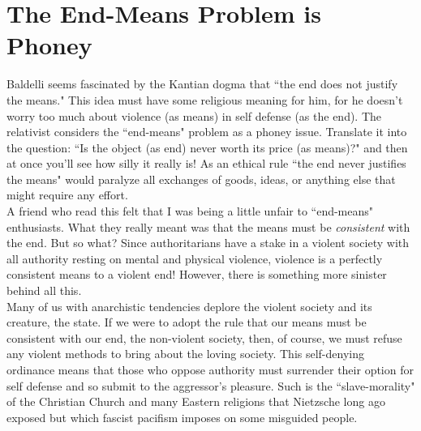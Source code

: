 \section*{The End-Means Problem is Phoney}
Baldelli seems fascinated by the Kantian dogma that ``the end does not justify the means." This idea must have some religious meaning for him, for he doesn't worry too much about violence (as means) in self defense (as the end). The relativist considers the ``end-means" problem as a phoney issue. Translate it into the question: ``Is the object (as end) never worth its price (as means)?" and then at once you'll see how silly it really is! As an ethical rule ``the end never justifies the means" would paralyze all exchanges of goods, ideas, or anything else that might require any effort.\\
A friend who read this felt that I was being a little unfair to ``end-means" enthusiasts. What they really meant was that the means must be \emph{consistent} with the end. But so what? Since authoritarians have a stake in a violent society with all authority resting on mental and physical violence, violence is a perfectly consistent means to a violent end! However, there is something more sinister behind all this.\\
Many of us with anarchistic tendencies deplore the violent society and its creature, the state. If we were to adopt the rule that our means must be consistent with our end, 
the non-violent society, then, of course, we must refuse any violent methods to bring about the loving society. This self-denying ordinance means that those who oppose authority must surrender their option for self defense and so submit to the aggressor's pleasure. Such is the ``slave-morality" of the Christian Church and many Eastern religions that Nietzsche long ago exposed but which fascist pacifism imposes on some misguided people.

